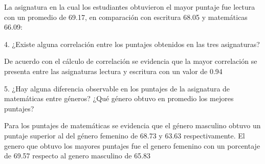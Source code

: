 La asignatura en la cual los estudiantes obtuvieron el mayor puntaje fue lectura con un promedio de 69.17, en comparación con escritura 68.05 y matemáticas 66.09:

 


4.	 ¿Existe alguna correlación entre los puntajes obtenidos en las tres asignaturas?

De acuerdo con el cálculo de correlación se evidencia que la mayor correlación se presenta entre las asignaturas lectura y escritura con un valor de 0.94

 





5.	¿Hay alguna diferencia observable en los puntajes de la asignatura de matemáticas entre géneros? ¿Qué género obtuvo en promedio los mejores puntajes?

Para los puntajes de matemáticas se evidencia que el género masculino obtuvo un puntaje superior al del género femenino de 68.73 y 63.63 respectivamente. El genero que obtuvo los mayores puntajes fue el genero femenino con un porcentaje de 69.57 respecto al genero masculino de 65.83

 
